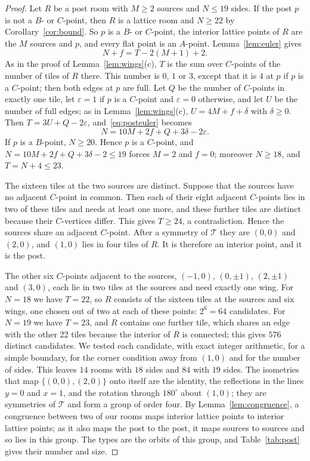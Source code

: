 \documentclass[11pt,a4paper]{article}
\theoremstyle{plain}
\theoremstyle{definition}
\theoremstyle{remark}
\newcommand{\T}{\mathcal{T}}
\newcommand{\dg}{^\circ}
\numberwithin{equation}{section}
\begin{document}
\begin{proof}
Let $R$ be a post room with $M\ge2$ sources and $N\le19$ sides. If the post $p$ is not a $B$- or $C$-point, then $R$ is a lattice room and $N\ge22$ by Corollary~\ref{cor:bound}. So $p$ is a $B$- or $C$-point, the interior lattice points of $R$ are the $M$ sources and $p$, and every flat point is an $A$-point. Lemma~\ref{lem:euler} gives
\begin{equation}\label{eq:posteuler}
N+f=T-2(M+1)+2.
\end{equation}
As in the proof of Lemma~\ref{lem:wings}(c), $T$ is the sum over $C$-points of the number of tiles of $R$ there. This number is $0$, $1$ or $3$, except that it is $4$ at $p$ if $p$ is a $C$-point; then both edges at $p$ are full. Let $Q$ be the number of $C$-points in exactly one tile, let $\varepsilon=1$ if $p$ is a $C$-point and $\varepsilon=0$ otherwise, and let $U$ be the number of full edges; as in Lemma~\ref{lem:wings}(c), $U=4M+f+\delta$ with $\delta\ge0$. Then $T=3U+Q-2\varepsilon$, and~\eqref{eq:posteuler} becomes
\[
N=10M+2f+Q+3\delta-2\varepsilon.
\]
If $p$ is a $B$-point, $N\ge20$. Hence $p$ is a $C$-point, and $N=10M+2f+Q+3\delta-2\le19$ forces $M=2$ and $f=0$; moreover $N\ge18$, and $T=N+4\le23$.

The sixteen tiles at the two sources are distinct. Suppose that the sources have no adjacent $C$-point in common. Then each of their eight adjacent $C$-points lies in two of these tiles and needs at least one more, and these further tiles are distinct because their $C$-vertices differ. This gives $T\ge24$, a contradiction. Hence the sources share an adjacent $C$-point. After a symmetry of $\T$ they are $(0,0)$ and $(2,0)$, and $(1,0)$ lies in four tiles of $R$. It is therefore an interior point, and it is the post.

The other six $C$-points adjacent to the sources, $(-1,0)$, $(0,\pm1)$, $(2,\pm1)$ and $(3,0)$, each lie in two tiles at the sources and need exactly one wing. For $N=18$ we have $T=22$, so $R$ consists of the sixteen tiles at the sources and six wings, one chosen out of two at each of these points: $2^6=64$ candidates. For $N=19$ we have $T=23$, and $R$ contains one further tile, which shares an edge with the other 22 tiles because the interior of $R$ is connected; this gives $576$ distinct candidates. We tested each candidate, with exact integer arithmetic, for a simple boundary, for the corner condition away from $(1,0)$ and for the number of sides. This leaves $14$ rooms with $18$ sides and $84$ with $19$ sides. The isometries that map $\{(0,0),(2,0)\}$ onto itself are the identity, the reflections in the lines $y=0$ and $x=1$, and the rotation through $180\dg$ about $(1,0)$; they are symmetries of $\T$ and form a group of order four. By Lemma~\ref{lem:congruence}, a congruence between two of our rooms maps interior lattice points to interior lattice points; as it also maps the post to the post, it maps sources to sources and so lies in this group. The types are the orbits of this group, and Table~\ref{tab:post} gives their number and size.
\end{proof}
\end{document}
